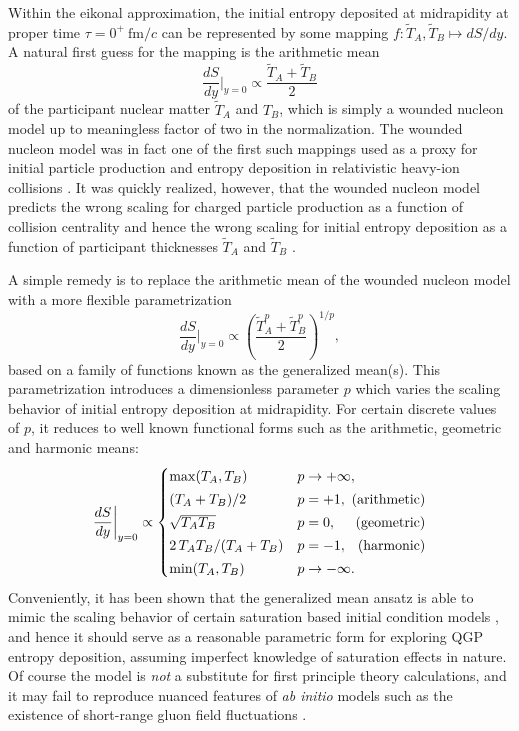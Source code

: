 \documentclass[aps,prc,reprint,amsmath,nofootinbib]{revtex4-1}
\newcommand{\fmc}{\ensuremath{\text{fm}/c}}
\newcommand{\T}{\tilde{T}}
\begin{document}
Within the eikonal approximation, the initial entropy deposited at midrapidity at proper time $\tau=0^+\ \fmc$ can be represented by some mapping ${f: \T_A, \T_B \mapsto dS/dy}$.
A natural first guess for the mapping is the arithmetic mean
\begin{equation}
  \frac{dS}{dy}\bigg\vert_{y=0} \propto \frac{\T_A + \T_B}{2}
\end{equation}
of the participant nuclear matter $\T_A$ and $T_B$, which is simply a wounded nucleon model up to meaningless factor of two in the normalization.
The wounded nucleon model was in fact one of the first such mappings used as a proxy for initial particle production and entropy deposition in relativistic heavy-ion collisions \cite{Bialas:1976ed}.
It was quickly realized, however, that the wounded nucleon model predicts the wrong scaling for charged particle production as a function of collision centrality and hence the wrong scaling for initial entropy deposition as a function of participant thicknesses $\T_A$ and $\T_B$ \cite{Kharzeev:2000ph}.

A simple remedy is to replace the arithmetic mean of the wounded nucleon model with a more flexible parametrization
\begin{equation}
  \label{eq:gmean}
  \frac{dS}{dy}\bigg\vert_{y=0} \propto \left( \frac{\T_A^p + \T_B^p}{2} \right)^{1/p},
\end{equation}
based on a family of functions known as the generalized mean(s).
This parametrization introduces a dimensionless parameter $p$ which varies the scaling behavior of initial entropy deposition at midrapidity.
For certain discrete values of $p$, it reduces to well known functional forms such as the arithmetic, geometric and harmonic means:
\begin{equation}
  \newlength{\extraspace}
  \setlength{\extraspace}{0.5ex}
  \frac{dS}{dy}\bigg\vert_{y=0} \propto
  \begin{cases}
    \max(T_A, T_B) & p \rightarrow +\infty, \\[\extraspace]
    (T_A + T_B)/2 & p = +1, \hfill \text{ (arithmetic)} \\[\extraspace]
    \sqrt{T_A T_B} & p = 0, \hfill \text{ (geometric)} \\[\extraspace]
    2\, T_A T_B/(T_A + T_B) & p = -1, \hfill \text{ (harmonic)} \\[\extraspace]
    \min(T_A, T_B) & p \rightarrow -\infty.
  \end{cases}
  \label{eq:trento_p}
\end{equation}
Conveniently, it has been shown that the generalized mean ansatz is able to mimic the scaling behavior of certain saturation based initial condition models \cite{Bernhard:2016tnd}, and hence it should serve as a reasonable parametric form for exploring QGP entropy deposition, assuming imperfect knowledge of saturation effects in nature.
Of course the model is \emph{not} a substitute for first principle theory calculations, and it may fail to reproduce nuanced features of \emph{ab initio} models such as the existence of short-range gluon field fluctuations \cite{Schenke:2012wb}.
\end{document}
